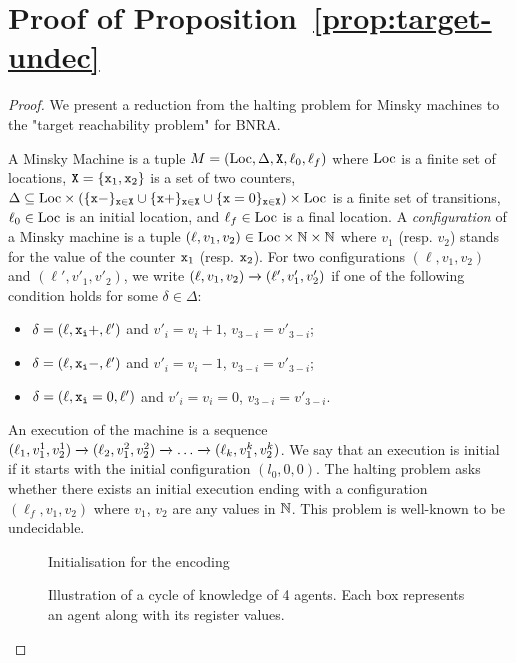 \section{Proof of Proposition~\ref{prop:target-undec}}
\label{app:target}

\propTargetUndecidable*

\begin{proof}
	We present a reduction from the halting problem for Minsky machines to the "target reachability problem" for BNRA.
	
	A Minsky Machine is a tuple $M= (\text{Loc}, \Delta, \mathtt{X}, \ell_0, \ell_f)$ where $\text{Loc}$ is a finite set of locations, $\mathtt{X} = \{\mathtt{x}_1, \mathtt{x}_2\}$ is a set of two counters, $\Delta \subseteq \text{Loc} \times (\{\mathtt{\mathtt{x}}-\}_{\mathtt{x} \in \mathtt{X}} \cup \{\mathtt{\mathtt{x}}+\}_{\mathtt{x} \in \mathtt{X}} \cup \{\mathtt{\mathtt{x}}=0\}_{\mathtt{x} \in \mathtt{X}} ) \times \text{Loc}$ is a finite set of transitions, $\ell_0 \in \text{Loc}$ is an initial location, and $\ell_f \in \text{Loc}$ is a final location. A \emph{configuration} of a Minsky machine is a tuple $(\ell, v_1, v_2) \in \text{Loc} \times \mathbb{N} \times \mathbb{N}$ where $v_1$ (resp. $v_2$) stands for the value of the counter $\mathtt{x}_1$ (resp. $\mathtt{x}_2$). 
	For two configurations $(\ell, v_1, v_2)$ and  $(\ell', v'_1, v'_2)$, we write $(\ell, v_1, v_2) \xrightarrow{} (\ell', v'_1, v'_2)$ if one of the following condition holds for some $\delta \in \Delta$:
	\begin{itemize}
		\item $\delta = (\ell, \mathtt{\mathtt{x}_i}+, \ell')$ and $v'_i = v_i+1$, $v_{3-i} = v'_{3-i}$;
		\item $\delta = (\ell, \mathtt{\mathtt{x}_i}-, \ell')$ and $v'_i = v_i-1$, $v_{3-i} = v'_{3-i}$;
		\item $\delta = (\ell, \mathtt{\mathtt{x}_i}=0, \ell')$ and $v'_i = v_i = 0$, $v_{3-i} = v'_{3-i}$.
	\end{itemize}
	An execution of the machine is a sequence $(\ell_1, v_1^1, v_2^1) \xrightarrow{} (\ell_2, v_1^2, v_2^2) \xrightarrow{} \dots \xrightarrow{} (\ell_k, v_1^k, v_2^k)$. We say that an execution is initial if it starts with the initial configuration $(l_0, 0, 0)$.
	The halting problem asks whether there exists an initial execution ending with a configuration $(\ell_f, v_1, v_2)$ where $v_1$, $v_2$ are any values in $\mathbb{N}$. This problem is well-known to be undecidable.
	
	
	\begin{figure}[h]
	
	\caption{Initialisation for the \TARGET encoding}\label{fig:target-init}
\end{figure}
	\begin{figure}
		
		\caption{Illustration of a cycle of knowledge of 4 agents. Each box represents an agent along with its register values.}\label{fig:target-cycle-knowledge}
	\end{figure}
	


\end{proof}
